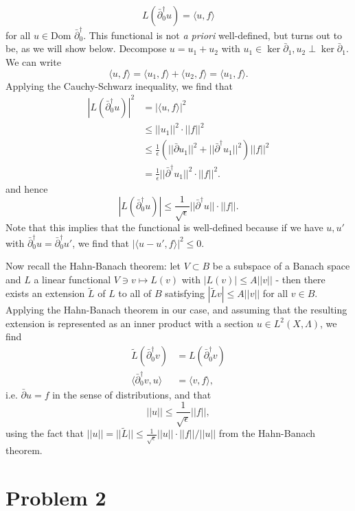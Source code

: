 \documentclass{../mathnotes}
\begin{document}
\begin{enumerate}[(a)]
        \[L(\bar\partial^\dagger_0u)=\langle u,f\rangle\]
        for all $u\in\text{Dom }\bar\partial_0^\dagger$. This functional is not \textit{a priori} well-defined, but
        turns out to be, as we will show below.
        Decompose $u=u_1+u_2$ with $u_1\in\ker\bar\partial_1,u_2\perp\ker\bar\partial_1$. We can write
        \[\langle u,f\rangle=\langle u_1,f\rangle+\langle u_2,f\rangle=\langle u_1,f\rangle.\]
        Applying the Cauchy-Schwarz inequality, we find that
        \begin{align*}
            |L(\bar\partial^\dagger_0u)|^2&= |\langle u,f\rangle|^2 \\
            &\leq ||u_1||^2\cdot||f||^2\\
            &\leq \frac{1}{\epsilon}(||\bar\partial u_1||^2+||\bar\partial^\dagger u_1||^2)||f||^2\\
            &=\frac{1}{\epsilon} ||\bar\partial^\dagger u_1||^2\cdot ||f||^2.
        \end{align*}
        and hence
        \[|L(\bar\partial_0^\dagger u)|\leq \frac{1}{\sqrt{\epsilon}}||\bar\partial^\dagger u||\cdot ||f||.\]
        Note that this implies that the functional is well-defined because if we have $u, u'$ with $\bar\partial^\dagger_0u=\bar\partial^\dagger_0u'$,
        we find that $|\langle u-u',f\rangle|^2\leq 0$.

        Now recall the Hahn-Banach theorem: let $V\subset B$ be a subspace of a Banach space and $L$ a linear functional $V\ni v\mapsto L(v)$
        with $|L(v)|\leq A||v||$ - then there exists an extension $\tilde L$ of $L$ to all of $B$ satisfying $|\tilde Lv|\leq A||v||$ for all $v\in B$.
        Applying the Hahn-Banach theorem in our case, and assuming that the resulting extension is represented as an inner product with
        a section $u\in L^2(X,\Lambda)$, we find
        \begin{align*}
            \tilde L(\bar\partial^\dagger_0v)&=L(\bar\partial^\dagger_0v)\\
            \langle\bar\partial_0^\dagger v,u \rangle&=\langle v,f \rangle,
        \end{align*}
        i.e. $\bar\partial u=f$ in the sense of distributions, and that
        \[||u||\leq \frac{1}{\sqrt{\epsilon}}||f||,\]
        using the fact that $||u||=||\tilde L||\leq \frac{1}{\sqrt{\epsilon}}||u||\cdot ||f||/||u||$ from the Hahn-Banach theorem.
        
\end{enumerate}

\section*{Problem 2}
\end{document}
